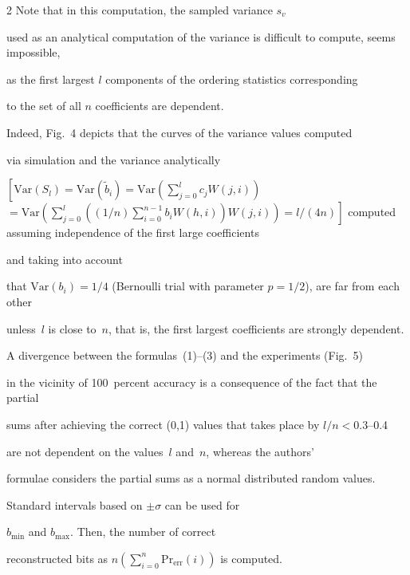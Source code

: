 \begin{multicols}{2}
Note that in this computation,  the sampled variance $s_v$


used as an analytical computation of the variance is difficult to compute, seems impossible, 

as the first  largest $l$ components of the ordering statistics corresponding 

to the set of all $n$ coefficients are dependent.

 Indeed, Fig.~4 depicts that the curves of the variance values computed 

 via simulation  and the variance analytically  

 $\left[\mathrm{Var}\left(S_l\right) = \mathrm{Var}\left(\tilde b_i\right) 

 = \mathrm{Var}\left(\sum\limits_{j=0}^{l} 

 c_j W(j,i)\right)\right.$\linebreak $\left.= \mathrm{Var}

 \left(\sum\limits_{j=0}^{l} ((1/n) \sum\limits_{i=0}^{n-1} b_i W(h,i)) W(j,i)\right)= 

 l/(4n)\right]$ computed assuming independence of the first large coefficients 

 and taking  into account 

 that $\mathrm{Var}\left(b_i\right)=1/4 $ (Bernoulli trial with parameter $p=1/2$), are far from each other 

 unless~$l$ is close to~$n$, that is, the first largest coefficients are strongly dependent.



 A divergence between the formulas~(1)--(3) and the experiments (Fig.~5) 

 in the vicinity of 100~percent  accuracy is  a consequence of the fact that the partial 

 sums after achieving the correct (0,1) values that takes place by $l/n< 0.3$--0.4 

 are not dependent on the values~$l$ and~$n$, whereas the authors'

 formulae considers the partial   sums as a normal distributed random values.



Standard intervals based on $\pm\sigma$ can be used for

$b_{\min}$ and $b_{\max}$. Then, the number of correct

reconstructed bits as $n\left(\sum\limits_{i=0}^{n} \mathrm{Pr}_{\mathrm{err}}(i)\right)$ is computed.


\end{multicols}
